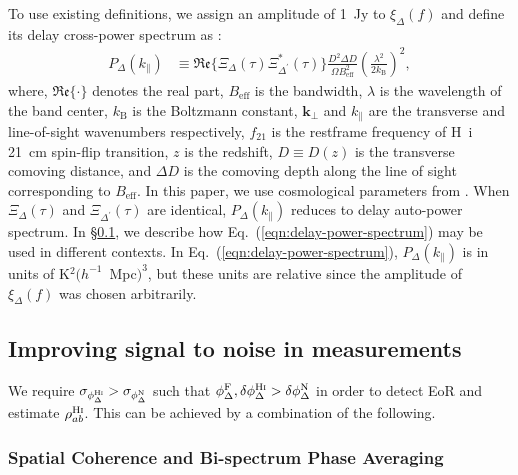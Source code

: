 \documentclass[
reprint,
superscriptaddress,
amsmath,
amssymb,
aps,
prd
]{revtex4-1}
\begin{document}
To use existing definitions, we assign an amplitude of 1~Jy to $\xi_\Delta(f)$ and define its delay cross-power spectrum as \cite{par12a,thy15a}:
\begin{align}
  P_\Delta(k_\parallel) &\equiv \mathfrak{Re}\bigg\{\Xi_\Delta(\tau)\Xi_{\Delta^\prime}^*(\tau)\bigg\} \frac{D^2\Delta D}{\Omega B_\textrm{eff}^2}\left(\frac{\lambda^2}{2k_\textrm{B}}\right)^2, \label{eqn:delay-power-spectrum}
\end{align}
where, $\mathfrak{Re}\{\cdot\}$ denotes the real part, $B_\textrm{eff}$ is the bandwidth, $\lambda$ is the wavelength of the band center, $k_\textrm{B}$ is the Boltzmann constant, $\boldsymbol{k}_\perp$ and $k_\parallel$ are the transverse and line-of-sight wavenumbers respectively, $f_{21}$ is the restframe frequency of H~{\sc i} 21~cm spin-flip transition, $z$ is the redshift, $D\equiv D(z)$ is the transverse comoving distance, and $\Delta D$ is the comoving depth along the line of sight corresponding to $B_\textrm{eff}$.
In this paper, we use cosmological parameters from 
\cite{wmap9cosmo}. When $\Xi_\Delta(\tau)$ and $\Xi_{\Delta^\prime}(\tau)$ are identical, $P_\Delta(k_\parallel)$ reduces to delay auto-power spectrum. In \S\ref{sec:averaging}, we describe how Eq.~(\ref{eqn:delay-power-spectrum}) may be used in different contexts. In Eq.~(\ref{eqn:delay-power-spectrum}), $P_\Delta(k_\parallel)$ is in units of K$^2 (h^{-1}$~Mpc$)^3$, but these units are relative since the amplitude of $\xi_\Delta(f)$ was chosen arbitrarily. 

\subsection{Improving signal to noise in measurements}\label{sec:averaging}

We require $\sigma_{\phi_\Delta^\textrm{H{\sc i}}} > \sigma_{\phi_\Delta^\textrm{N}}$ such that $\phi_\Delta^\textrm{F}, \delta\phi_\Delta^\textrm{H{\sc i}} > \delta\phi_\Delta^\textrm{N}$ in order to detect EoR and estimate $\rho_{ab}^\textrm{H{\sc i}}$. This can be achieved by a combination of the following.

\subsubsection{Spatial Coherence and Bi-spectrum Phase  Averaging}\label{sec:vis-avg}
\end{document}
